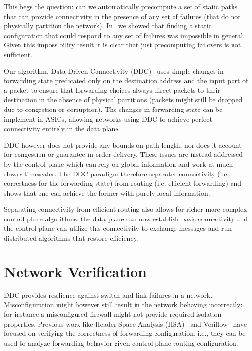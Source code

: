 \documentclass[letterpaper]{article}
\begin{document}
This begs the question: can we automatically precompute a set of static paths that can provide connectivity in the
presence of any set of failures (that do not physically partition the network). In~\cite{feigenbaum12resilience} we
showed that finding a static configuration that could respond to any set of failures was impossible in general. Given
this impossibility result it is clear that just precomputing failovers is not sufficient.

Our algorithm, Data Driven Connectivity (DDC)~\cite{liu13ddc} uses simple changes in forwarding state predicated
only on the destination address and the input port of a packet to ensure that forwarding choices always direct packets
to their destination in the absence of physical partitions (packets might still be dropped due to congestion or
corruption). The changes in forwarding state can be implement in ASICs, allowing networks using DDC to achieve perfect
connectivity entirely in the data plane.

DDC however does not provide any bounds on path length, nor does it account for congestion or guarantee in-order
delivery. These issues are instead addressed by the control plane which can rely on global information and work at much
slower timescales. The DDC paradigm therefore separates connectivity (i.e., correctness for the forwarding state) from
routing (i.e. efficient forwarding) and shows that one can achieve the former with purely local information. 

Separating connectivity from efficient routing also allows for richer more complex control plane algorithms: the data
plane can now establish basic connectivity and the control plane can utilize this connectivity to exchange messages and
run distributed algorithms that restore efficiency.

\section*{Network Verification}
DDC provides resilience against switch and link failures in a network. Misconfiguration might however still result in
the network behaving incorrectly: for instance a misconfigured firewall might not provide required isolation properties.
Previous work like Header Space Analysis (HSA)~\cite{kazemian2012header} and Veriflow~\cite{khurshid13veriflow} have
focused on verifying the correctness of forwarding configuration: i.e., they can be used to analyze forwarding behavior
given control plane routing configuration.
\end{document}
